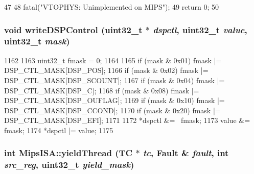 \begin{DoxyCode}
47 {
48     fatal("VTOPHYS: Unimplemented on MIPS\n");
49     return 0;
50 }
\end{DoxyCode}
\hypertarget{namespaceMipsISA_ad74065c805a5647e31fec67534caf1e9}{
\subsubsection[{writeDSPControl}]{\setlength{\rightskip}{0pt plus 5cm}void writeDSPControl ({\bf uint32\_\-t} $\ast$ {\em dspctl}, \/  {\bf uint32\_\-t} {\em value}, \/  {\bf uint32\_\-t} {\em mask})}}
\label{namespaceMipsISA_ad74065c805a5647e31fec67534caf1e9}



\begin{DoxyCode}
1162 {
1163     uint32_t fmask = 0;
1164 
1165     if (mask & 0x01) fmask |= DSP_CTL_MASK[DSP_POS];
1166     if (mask & 0x02) fmask |= DSP_CTL_MASK[DSP_SCOUNT];
1167     if (mask & 0x04) fmask |= DSP_CTL_MASK[DSP_C];
1168     if (mask & 0x08) fmask |= DSP_CTL_MASK[DSP_OUFLAG];
1169     if (mask & 0x10) fmask |= DSP_CTL_MASK[DSP_CCOND];
1170     if (mask & 0x20) fmask |= DSP_CTL_MASK[DSP_EFI];
1171 
1172     *dspctl &= ~fmask;
1173     value &= fmask;
1174     *dspctl |= value;
1175 }
\end{DoxyCode}
\hypertarget{namespaceMipsISA_a93f5e230d4726543a01ed483a2ea4070}{
\subsubsection[{yieldThread}]{\setlength{\rightskip}{0pt plus 5cm}int MipsISA::yieldThread (TC $\ast$ {\em tc}, \/  {\bf Fault} \& {\em fault}, \/  int {\em src\_\-reg}, \/  {\bf uint32\_\-t} {\em yield\_\-mask})}}
\label{namespaceMipsISA_a93f5e230d4726543a01ed483a2ea4070}



